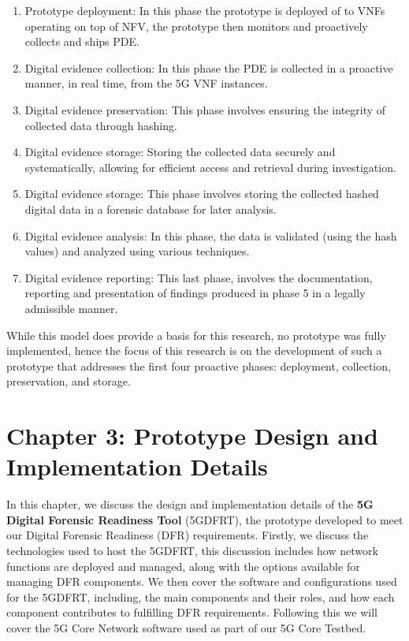 \documentclass[final,1p,times,authoryear]{elsarticle}
\begin{document}
\begin{enumerate}
	\item Prototype deployment: In this phase the prototype is deployed of to VNFs operating on top of NFV, the prototype then monitors and proactively collects and ships PDE.
	\item Digital evidence collection: In this phase the PDE is collected in a proactive manner, in real time, from the 5G VNF instances.
	\item Digital evidence preservation: This phase involves ensuring the integrity of collected data through hashing.
	\item Digital evidence storage: Storing the collected data securely and systematically, allowing for efficient access and retrieval during investigation. 
	\item Digital evidence storage: This phase involves storing the collected hashed digital data in a forensic database for later analysis.
	\item Digital evidence analysis: In this phase, the data is validated (using the hash values) and analyzed using various techniques.
	\item Digital evidence reporting: This last phase, involves the documentation, reporting and presentation of findings produced in phase 5 in a legally admissible manner.
\end{enumerate}

While this model does provide a basis for this research, no prototype was fully implemented, hence the focus of this research is on the development of such a prototype that addresses the first four proactive phases: deployment, collection, preservation, and storage.

\newpage

\section{Chapter 3: Prototype Design and Implementation Details}
\label{sec3}
In this chapter, we discuss the design and implementation details of the \textbf{5G Digital Forensic Readiness Tool} (5GDFRT), the prototype developed to meet our Digital Forensic Readiness (DFR) requirements. Firstly, we discuss the technologies used to host the 5GDFRT, this discussion includes how network functions are deployed and managed, along with the options available for managing DFR components. We then cover the software and configurations used for the 5GDFRT, including, the main components and their roles, and how each component contributes to fulfilling DFR requirements. Following this we will cover the 5G Core Network software used as part of our 5G Core Testbed.
\end{document}
